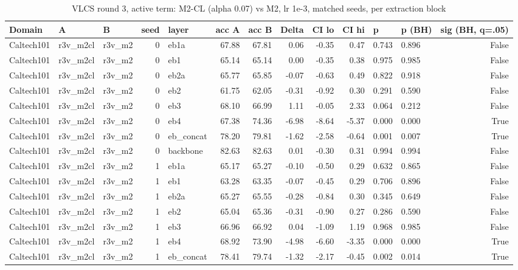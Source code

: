 \begin{table}
\caption{VLCS round 3, active term: M2-CL (alpha 0.07) vs M2, lr 1e-3, matched seeds, per extraction block}
\label{tab:leak_r3v_cl_effect_at_taps}
\begin{tabular}{lllrlrrrrrllr}
\toprule
Domain & A & B & seed & layer & acc A & acc B & Delta & CI lo & CI hi & p & p (BH) & sig (BH, q=.05) \\
\midrule
Caltech101 & r3v\_m2cl & r3v\_m2 & 0 & eb1a & 67.88 & 67.81 & 0.06 & -0.35 & 0.47 & 0.743 & 0.896 & False \\
Caltech101 & r3v\_m2cl & r3v\_m2 & 0 & eb1 & 65.14 & 65.14 & 0.00 & -0.35 & 0.38 & 0.975 & 0.985 & False \\
Caltech101 & r3v\_m2cl & r3v\_m2 & 0 & eb2a & 65.77 & 65.85 & -0.07 & -0.63 & 0.49 & 0.822 & 0.918 & False \\
Caltech101 & r3v\_m2cl & r3v\_m2 & 0 & eb2 & 61.75 & 62.05 & -0.31 & -0.92 & 0.30 & 0.291 & 0.590 & False \\
Caltech101 & r3v\_m2cl & r3v\_m2 & 0 & eb3 & 68.10 & 66.99 & 1.11 & -0.05 & 2.33 & 0.064 & 0.212 & False \\
Caltech101 & r3v\_m2cl & r3v\_m2 & 0 & eb4 & 67.38 & 74.36 & -6.98 & -8.64 & -5.37 & 0.000 & 0.000 & True \\
Caltech101 & r3v\_m2cl & r3v\_m2 & 0 & eb\_concat & 78.20 & 79.81 & -1.62 & -2.58 & -0.64 & 0.001 & 0.007 & True \\
Caltech101 & r3v\_m2cl & r3v\_m2 & 0 & backbone & 82.63 & 82.63 & 0.01 & -0.30 & 0.31 & 0.994 & 0.994 & False \\
Caltech101 & r3v\_m2cl & r3v\_m2 & 1 & eb1a & 65.17 & 65.27 & -0.10 & -0.50 & 0.29 & 0.632 & 0.865 & False \\
Caltech101 & r3v\_m2cl & r3v\_m2 & 1 & eb1 & 63.28 & 63.35 & -0.07 & -0.45 & 0.29 & 0.706 & 0.896 & False \\
Caltech101 & r3v\_m2cl & r3v\_m2 & 1 & eb2a & 65.27 & 65.55 & -0.28 & -0.84 & 0.30 & 0.345 & 0.649 & False \\
Caltech101 & r3v\_m2cl & r3v\_m2 & 1 & eb2 & 65.04 & 65.36 & -0.31 & -0.90 & 0.27 & 0.286 & 0.590 & False \\
Caltech101 & r3v\_m2cl & r3v\_m2 & 1 & eb3 & 66.96 & 66.92 & 0.04 & -1.09 & 1.19 & 0.968 & 0.985 & False \\
Caltech101 & r3v\_m2cl & r3v\_m2 & 1 & eb4 & 68.92 & 73.90 & -4.98 & -6.60 & -3.35 & 0.000 & 0.000 & True \\
Caltech101 & r3v\_m2cl & r3v\_m2 & 1 & eb\_concat & 78.41 & 79.74 & -1.32 & -2.17 & -0.45 & 0.002 & 0.014 & True \\

\end{tabular}
\end{table}
